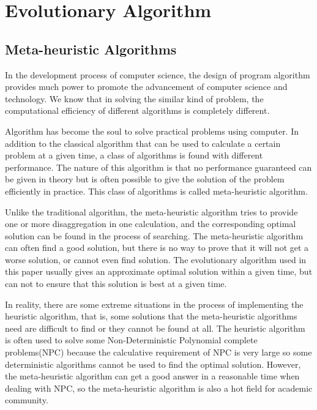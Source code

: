 
\section{Evolutionary Algorithm}

\subsection{Meta-heuristic Algorithms}
%
In the development process of computer science, the design of program 
algorithm provides much power to promote the advancement of computer science 
and technology. We know that in solving the similar kind of problem, the 
computational efficiency of different algorithms is completely different. 


Algorithm has become the soul to solve practical problems using computer. In
addition to the classical algorithm that can be used to calculate a certain
problem at a given time, a class of algorithms is found with different
performance. The nature of this algorithm is that no performance guaranteed can
be given in theory but is often possible to give the solution of the problem
efficiently in practice. This class of algorithms is called meta-heuristic
algorithm.

Unlike the traditional algorithm, the meta-heuristic algorithm tries to 
provide one or more disaggregation in one calculation, and the corresponding 
optimal solution can be found in the process of searching. The meta-heuristic 
algorithm can often find a good solution, but there is no way to prove that 
it will not get a worse solution, or cannot even find solution. The 
evolutionary algorithm used in this paper usually gives an approximate 
optimal solution within a given time, but can not to ensure that this solution 
is best at a given time.

In reality, there are some extreme situations in the process of implementing 
the heuristic algorithm, that is, some solutions that the meta-heuristic 
algorithms need are difficult to find or they cannot be found at all. The 
heuristic algorithm is often used to solve some Non-Deterministic Polynomial 
complete problems(NPC) because the calculative requirement of NPC is very 
large so some deterministic algorithms cannot be used to find the optimal 
solution. However, the meta-heuristic algorithm can get a good answer in a 
reasonable time when dealing with NPC, so the meta-heuristic algorithm is 
also a hot field for academic community.

